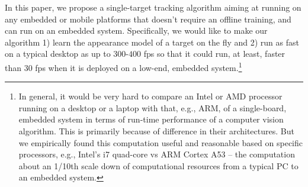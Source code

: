 \documentclass{bmvc2k}
\begin{document}
In this paper, we propose a single-target tracking algorithm aiming at
running on any embedded or mobile platforms that doesn't require an
offline training, and can run on an embedded system. Specifically, we
would like to make our algorithm 1) learn the appearance model of a
target on the fly and 2) run as fast on a typical desktop as up to
$300$-$400$ fps so that it could run, at least, faster than 30 fps
when it is deployed on a low-end, embedded system.\footnote{In
  general, it would be very hard to compare an Intel or AMD processor
  running on a desktop or a laptop with that, e.g., ARM, of a
  single-board, embedded system in terms of run-time performance of a
  computer vision algorithm. This is primarily because of difference
  in their architectures. But we empirically found this computation
  useful and reasonable based on specific processors, e.g., Intel's i7
  quad-core vs ARM Cortex A53 -- the computation about an 1/10th scale
  down of computational resources from a typical PC to an embedded
  system.}
\end{document}
